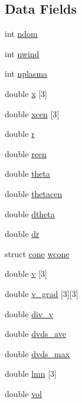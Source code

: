 \subsection*{Data Fields}
\begin{DoxyCompactItemize}
\item 
int \hyperlink{structwind_aaa7f27e1a93690e4c37878a93c40db22}{ndom}
\item 
int \hyperlink{structwind_aa879b7be5a0f232f2fde3a95e85824b6}{nwind}
\item 
int \hyperlink{structwind_ae01b6d799a4f0a60142703606c9fea3c}{nplasma}
\item 
double \hyperlink{structwind_aa79ef3a918f25e67318af1200ea49bd7}{x} \mbox{[}3\mbox{]}
\item 
double \hyperlink{structwind_a289fcd4f4c7e344d112785545192cffe}{xcen} \mbox{[}3\mbox{]}
\item 
double \hyperlink{structwind_a68090533c7fa4c2bc4f1272a71012b5c}{r}
\item 
double \hyperlink{structwind_a94d793823c987a311e4abcd1f2c4aad0}{rcen}
\item 
double \hyperlink{structwind_ab555fb67dfd86ffa4710da52b5edd39d}{theta}
\item 
double \hyperlink{structwind_a876ccd0541a3488e8faa62f1a9edc080}{thetacen}
\item 
double \hyperlink{structwind_ab2fe12e1a8862dae8bf49dca7b44cee7}{dtheta}
\item 
double \hyperlink{structwind_aecd2315036110808fa470bffbf36e6a8}{dr}
\item 
struct \hyperlink{structcone}{cone} \hyperlink{structwind_a4d0d6b2e0e7f6d8500f66efdb639f233}{wcone}
\item 
double \hyperlink{structwind_a9e2fcac3826b36b7a4eed3eb74f45ede}{v} \mbox{[}3\mbox{]}
\item 
double \hyperlink{structwind_a7f9f96a08008c3354c3f681b3d9c672e}{v\+\_\+grad} \mbox{[}3\mbox{]}\mbox{[}3\mbox{]}
\item 
double \hyperlink{structwind_a25a5b831a64c649f280da38e9b8821d9}{div\+\_\+v}
\item 
double \hyperlink{structwind_a4d9c9c37e5ea6f91b06918e723217fed}{dvds\+\_\+ave}
\item 
double \hyperlink{structwind_aa03474c00bb0ac035bd883ef18c4edac}{dvds\+\_\+max}
\item 
double \hyperlink{structwind_a021e9cbe88f7b0840038d3943f8818d2}{lmn} \mbox{[}3\mbox{]}
\item 
double \hyperlink{structwind_a86864abe3bc4d97d1b4c305f085c6c55}{vol}

\end{DoxyCompactItemize}
